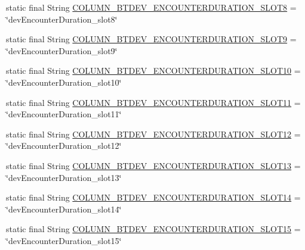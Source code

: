 \begin{DoxyCompactItemize}
\item 
static final String \hyperlink{classcs_1_1usense_1_1db_1_1_usense_s_q_lite_helper_ac1e829aa4cccca38913c92db7df8b9d7}{C\+O\+L\+U\+M\+N\+\_\+\+B\+T\+D\+E\+V\+\_\+\+E\+N\+C\+O\+U\+N\+T\+E\+R\+D\+U\+R\+A\+T\+I\+O\+N\+\_\+\+S\+L\+O\+T8} = \char`\"{}dev\+Encounter\+Duration\+\_\+slot8\char`\"{}
\item 
static final String \hyperlink{classcs_1_1usense_1_1db_1_1_usense_s_q_lite_helper_a62f005532947043d542f70863554121c}{C\+O\+L\+U\+M\+N\+\_\+\+B\+T\+D\+E\+V\+\_\+\+E\+N\+C\+O\+U\+N\+T\+E\+R\+D\+U\+R\+A\+T\+I\+O\+N\+\_\+\+S\+L\+O\+T9} = \char`\"{}dev\+Encounter\+Duration\+\_\+slot9\char`\"{}
\item 
static final String \hyperlink{classcs_1_1usense_1_1db_1_1_usense_s_q_lite_helper_a8f0570557668c9f71c70753cdd9e121b}{C\+O\+L\+U\+M\+N\+\_\+\+B\+T\+D\+E\+V\+\_\+\+E\+N\+C\+O\+U\+N\+T\+E\+R\+D\+U\+R\+A\+T\+I\+O\+N\+\_\+\+S\+L\+O\+T10} = \char`\"{}dev\+Encounter\+Duration\+\_\+slot10\char`\"{}
\item 
static final String \hyperlink{classcs_1_1usense_1_1db_1_1_usense_s_q_lite_helper_a9575b194bbe7dde54f677cf183360076}{C\+O\+L\+U\+M\+N\+\_\+\+B\+T\+D\+E\+V\+\_\+\+E\+N\+C\+O\+U\+N\+T\+E\+R\+D\+U\+R\+A\+T\+I\+O\+N\+\_\+\+S\+L\+O\+T11} = \char`\"{}dev\+Encounter\+Duration\+\_\+slot11\char`\"{}
\item 
static final String \hyperlink{classcs_1_1usense_1_1db_1_1_usense_s_q_lite_helper_ab468cb5fb3ba785de4f22692cd268900}{C\+O\+L\+U\+M\+N\+\_\+\+B\+T\+D\+E\+V\+\_\+\+E\+N\+C\+O\+U\+N\+T\+E\+R\+D\+U\+R\+A\+T\+I\+O\+N\+\_\+\+S\+L\+O\+T12} = \char`\"{}dev\+Encounter\+Duration\+\_\+slot12\char`\"{}
\item 
static final String \hyperlink{classcs_1_1usense_1_1db_1_1_usense_s_q_lite_helper_a59f39ee52f78d302d087c752b7ae4743}{C\+O\+L\+U\+M\+N\+\_\+\+B\+T\+D\+E\+V\+\_\+\+E\+N\+C\+O\+U\+N\+T\+E\+R\+D\+U\+R\+A\+T\+I\+O\+N\+\_\+\+S\+L\+O\+T13} = \char`\"{}dev\+Encounter\+Duration\+\_\+slot13\char`\"{}
\item 
static final String \hyperlink{classcs_1_1usense_1_1db_1_1_usense_s_q_lite_helper_a070fcefc99f7a5e5815199cc797c3f08}{C\+O\+L\+U\+M\+N\+\_\+\+B\+T\+D\+E\+V\+\_\+\+E\+N\+C\+O\+U\+N\+T\+E\+R\+D\+U\+R\+A\+T\+I\+O\+N\+\_\+\+S\+L\+O\+T14} = \char`\"{}dev\+Encounter\+Duration\+\_\+slot14\char`\"{}
\item 
static final String \hyperlink{classcs_1_1usense_1_1db_1_1_usense_s_q_lite_helper_a2dbe54ef35e5aa04d56db8c5a0296d01}{C\+O\+L\+U\+M\+N\+\_\+\+B\+T\+D\+E\+V\+\_\+\+E\+N\+C\+O\+U\+N\+T\+E\+R\+D\+U\+R\+A\+T\+I\+O\+N\+\_\+\+S\+L\+O\+T15} = \char`\"{}dev\+Encounter\+Duration\+\_\+slot15\char`\"{}

\end{DoxyCompactItemize}

